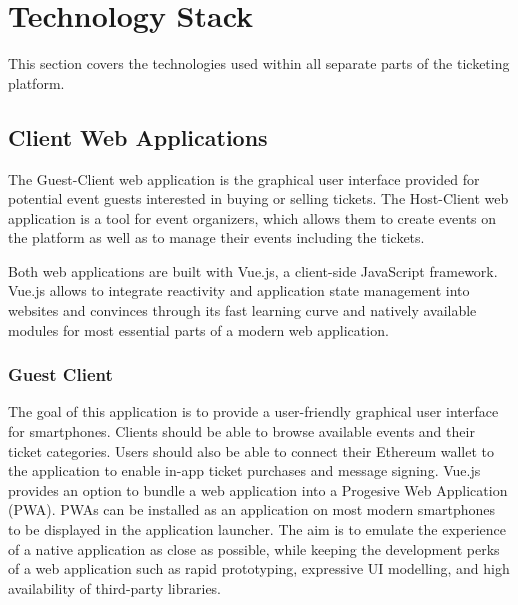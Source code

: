 \section{Technology Stack}\label{chapter:technology}

This section covers the technologies used within all separate parts of the ticketing platform.

\subsection{Client Web Applications}

The Guest-Client web application is the graphical user interface provided for potential event guests interested in buying or selling tickets. The Host-Client web application is a tool for event organizers, which allows them to create events on the platform as well as to manage their events including the tickets.

Both web applications are built with Vue.js, a client-side JavaScript framework. Vue.js allows to integrate reactivity and application state management into websites and convinces through its fast learning curve and natively available modules for most essential parts of a modern web application.

\subsubsection{Guest Client}

The goal of this application is to provide a user-friendly graphical user interface for smartphones. Clients should be able to browse available events and their ticket categories. Users should also be able to connect their Ethereum wallet to the application to enable in-app ticket purchases and message signing. Vue.js provides an option to bundle a web application into a Progesive Web Application (PWA). PWAs can be installed as an application on most modern smartphones to be displayed in the application launcher. The aim is to emulate the experience of a native application as close as possible, while keeping the development perks of a web application such as rapid prototyping, expressive UI modelling, and high availability of third-party libraries.

